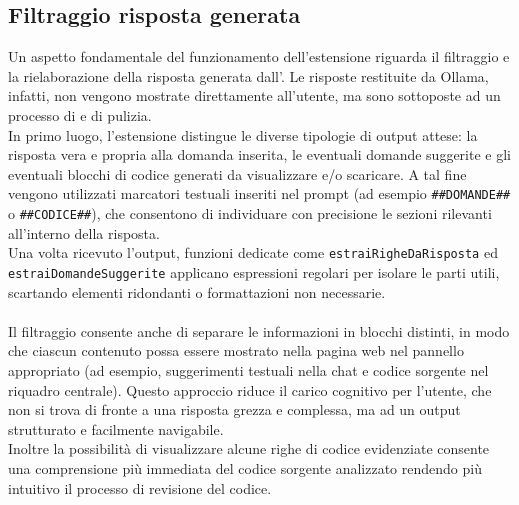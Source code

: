 \subsection{Filtraggio risposta generata}
\noindent Un aspetto fondamentale del funzionamento dell'estensione riguarda il filtraggio e la rielaborazione della risposta generata dall’. Le risposte restituite da Ollama, infatti, non vengono mostrate direttamente all’utente, ma sono sottoposte ad un processo di  e di pulizia.\\
In primo luogo, l’estensione distingue le diverse tipologie di output attese: la risposta vera e propria alla domanda inserita, le eventuali domande suggerite e gli eventuali blocchi di codice generati da visualizzare e/o scaricare. A tal fine vengono utilizzati marcatori testuali inseriti nel prompt (ad esempio \texttt{\#\#DOMANDE\#\#} o \texttt{\#\#CODICE\#\#}), che consentono di individuare con precisione le sezioni rilevanti all’interno della risposta. \\Una volta ricevuto l’output, funzioni dedicate come \texttt{estraiRigheDaRisposta} ed \\ \texttt{estraiDomandeSuggerite} applicano espressioni regolari per isolare le parti utili, scartando elementi ridondanti o formattazioni non necessarie.\\
\\
Il filtraggio consente anche di separare le informazioni in blocchi distinti, in modo che ciascun contenuto possa essere mostrato nella pagina web nel pannello appropriato (ad esempio, suggerimenti testuali nella chat e codice sorgente nel riquadro centrale). Questo approccio riduce il carico cognitivo per l’utente, che non si trova di fronte a una risposta grezza e complessa, ma ad un output strutturato e facilmente navigabile.\\ Inoltre la possibilità di visualizzare alcune righe di codice evidenziate consente una comprensione più immediata del codice sorgente analizzato rendendo più intuitivo il processo di revisione del codice.


